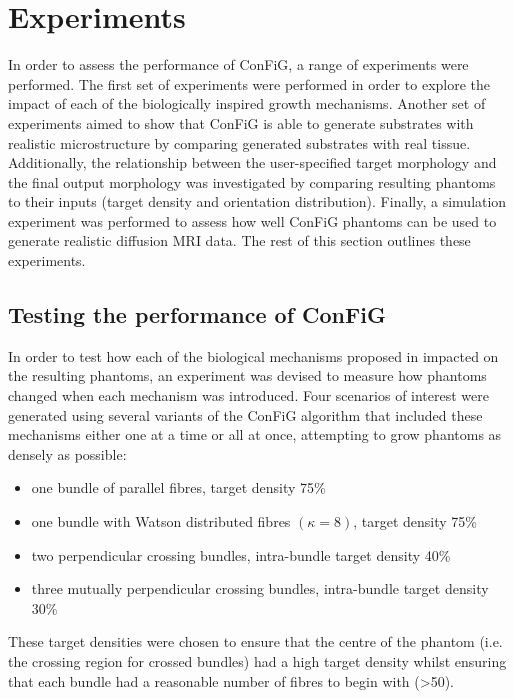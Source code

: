 \section{Experiments}
\label{sec:config_experiments}
In order to assess the performance of \ac{ConFiG}, a range of experiments were performed. The first set of experiments were performed in order to explore the impact of each of the biologically inspired growth mechanisms. Another set of experiments aimed to show that \ac{ConFiG} is able to generate substrates with realistic microstructure by comparing generated substrates with real tissue. Additionally, the relationship between the user-specified target morphology and the final output morphology was investigated by comparing resulting phantoms to their inputs (target density and orientation distribution). Finally, a simulation experiment was performed to assess how well \ac{ConFiG} phantoms can be used to generate realistic diffusion \ac{MRI} data. The rest of this section outlines these experiments.

\subsection{Testing the performance of \acs{ConFiG}}
\label{sec:config_test_perf}
In order to test how each of the biological mechanisms proposed in  impacted on the resulting phantoms, an experiment was devised to measure how phantoms changed when each mechanism was introduced. Four scenarios of interest were generated using several variants of the \ac{ConFiG} algorithm that included these mechanisms either one at a time or all at once, attempting to grow phantoms as densely as possible:
\begin{itemize}
  \item one bundle of parallel fibres, target density 75\%
  \item one bundle with Watson distributed fibres $(\kappa=8)$, target density 75\%
  \item two perpendicular crossing bundles, intra-bundle target density 40\%
  \item three mutually perpendicular crossing bundles, intra-bundle target density 30\%
\end{itemize}
These target densities were chosen to ensure that the centre of the phantom (i.e. the crossing region for crossed bundles) had a high target density whilst ensuring that each bundle had a reasonable number of fibres to begin with (>50).

